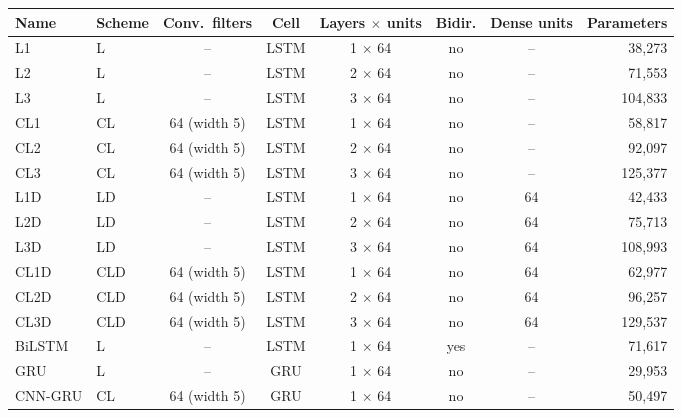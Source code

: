 \begin{tabular}{llcccccr}
\toprule
Name & Scheme & Conv.\ filters & Cell & Layers $\times$ units & Bidir. & Dense units & Parameters \\
\midrule
L1 & L & -- & LSTM & 1 $\times$ 64 & no & -- & 38,273 \\
L2 & L & -- & LSTM & 2 $\times$ 64 & no & -- & 71,553 \\
L3 & L & -- & LSTM & 3 $\times$ 64 & no & -- & 104,833 \\
CL1 & CL & 64 (width 5) & LSTM & 1 $\times$ 64 & no & -- & 58,817 \\
CL2 & CL & 64 (width 5) & LSTM & 2 $\times$ 64 & no & -- & 92,097 \\
CL3 & CL & 64 (width 5) & LSTM & 3 $\times$ 64 & no & -- & 125,377 \\
L1D & LD & -- & LSTM & 1 $\times$ 64 & no & 64 & 42,433 \\
L2D & LD & -- & LSTM & 2 $\times$ 64 & no & 64 & 75,713 \\
L3D & LD & -- & LSTM & 3 $\times$ 64 & no & 64 & 108,993 \\
CL1D & CLD & 64 (width 5) & LSTM & 1 $\times$ 64 & no & 64 & 62,977 \\
CL2D & CLD & 64 (width 5) & LSTM & 2 $\times$ 64 & no & 64 & 96,257 \\
CL3D & CLD & 64 (width 5) & LSTM & 3 $\times$ 64 & no & 64 & 129,537 \\
\midrule
BiLSTM & L & -- & LSTM & 1 $\times$ 64 & yes & -- & 71,617 \\
GRU & L & -- & GRU & 1 $\times$ 64 & no & -- & 29,953 \\
CNN-GRU & CL & 64 (width 5) & GRU & 1 $\times$ 64 & no & -- & 50,497 \\
\bottomrule
\end{tabular}